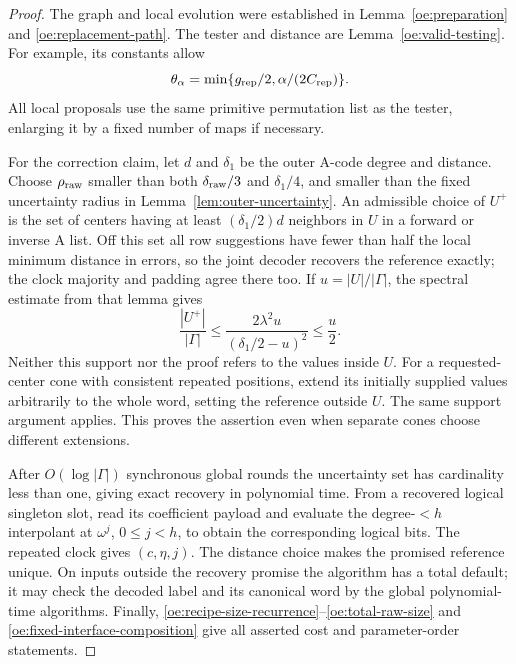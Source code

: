 \begin{proof}
The graph and local evolution were established in
Lemma~\ref{oe:preparation} and \eqref{oe:replacement-path}. The tester
and distance are Lemma~\ref{oe:valid-testing}. For example, its constants
allow
\[
 \theta_\alpha=
 \min\{g_{\rm rep}/2,\alpha/(2C_{\rm rep})\}.
\]
All local proposals use the same primitive permutation list as the
tester, enlarging it by a fixed number of maps if necessary.

For the correction claim, let $d$ and $\delta_1$ be the outer A-code
degree and distance. Choose $\rho_{\rm raw}$ smaller than both
$\delta_{\rm raw}/3$ and $\delta_1/4$, and smaller than the fixed
uncertainty radius in Lemma~\ref{lem:outer-uncertainty}. An admissible
choice of $U^+$ is the set of centers having at least $(\delta_1/2)d$
neighbors in $U$ in a forward or inverse A list. Off this set all row
suggestions have fewer than half the local minimum distance in errors,
so the joint decoder recovers the reference exactly; the clock majority
and padding agree there too. If $u=|U|/|\Gamma|$, the spectral estimate
from that lemma gives
\[
 \frac{|U^+|}{|\Gamma|}
 \leq\frac{2\lambda^2u}{(\delta_1/2-u)^2}
 \leq\frac u2.
\]
Neither this support nor the proof refers to the values inside $U$.
For a requested-center cone with consistent repeated positions, extend
its initially supplied values arbitrarily to the whole word, setting
the reference outside $U$. The same support argument applies. This
proves the assertion even when separate cones choose different
extensions.

After $O(\log|\Gamma|)$ synchronous global rounds the uncertainty set
has cardinality less than one, giving exact recovery in polynomial
time. From a recovered logical singleton slot, read its coefficient
payload and evaluate the degree-$<h$ interpolant at $\omega^j$,
$0\leq j<h$, to obtain the corresponding logical bits. The repeated
clock gives $(c,\eta,j)$. The distance choice makes the promised
reference unique. On inputs outside the recovery promise the algorithm
has a total default; it may check the decoded label and its canonical
word by the global polynomial-time algorithms. Finally,
\eqref{oe:recipe-size-recurrence}--\eqref{oe:total-raw-size} and
\eqref{oe:fixed-interface-composition} give all asserted cost and
parameter-order statements.
\end{proof}

